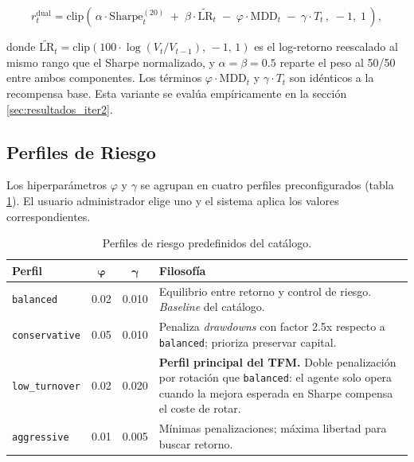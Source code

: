 \documentclass[IB,a4paper]{TFUOC}
\begin{document}
\begin{equation}
r_t^{\mathrm{dual}} = \mathrm{clip}\!\left(\,\alpha \cdot \mathrm{Sharpe}^{(20)}_t \;+\; \beta \cdot \widetilde{\mathrm{LR}}_t \;-\; \varphi \cdot \mathrm{MDD}_t \;-\; \gamma \cdot T_t\,,\; -1,\; 1\,\right),
\label{eq:reward_dual}
\end{equation}

donde $\widetilde{\mathrm{LR}}_t = \mathrm{clip}(100 \cdot \log(V_t / V_{t-1}),\, -1,\, 1)$ es el log-retorno reescalado al mismo rango que el Sharpe normalizado, y $\alpha = \beta = 0.5$ reparte el peso al 50/50 entre ambos componentes. Los términos $\varphi \cdot \mathrm{MDD}_t$ y $\gamma \cdot T_t$ son idénticos a la recompensa base. Esta variante se evalúa empíricamente en la sección \ref{sec:resultados_iter2}.

\subsection{Perfiles de Riesgo}
\label{sec:perfiles}

Los hiperparámetros $\varphi$ y $\gamma$ se agrupan en cuatro perfiles preconfigurados (tabla \ref{tab:perfiles}). El usuario administrador elige uno y el sistema aplica los valores correspondientes.

\begin{table}[h]
\centering
\renewcommand{\arraystretch}{1.25}
\begin{tabular}{|l|c|c|p{7.6cm}|}
\hline
\textbf{Perfil} & $\boldsymbol{\varphi}$ & $\boldsymbol{\gamma}$ & \textbf{Filosofía} \\ \hline
\texttt{balanced} & 0.02 & 0.010 & Equilibrio entre retorno y control de riesgo. \textit{Baseline} del catálogo. \\ \hline
\texttt{conservative} & 0.05 & 0.010 & Penaliza \textit{drawdowns} con factor 2.5x respecto a \texttt{balanced}; prioriza preservar capital. \\ \hline
\texttt{low\_turnover} & 0.02 & 0.020 & \textbf{Perfil principal del TFM.} Doble penalización por rotación que \texttt{balanced}: el agente solo opera cuando la mejora esperada en Sharpe compensa el coste de rotar. \\ \hline
\texttt{aggressive} & 0.01 & 0.005 & Mínimas penalizaciones; máxima libertad para buscar retorno. \\ \hline
\end{tabular}
\caption{Perfiles de riesgo predefinidos del catálogo.}
\label{tab:perfiles}
\end{table}
\end{document}
